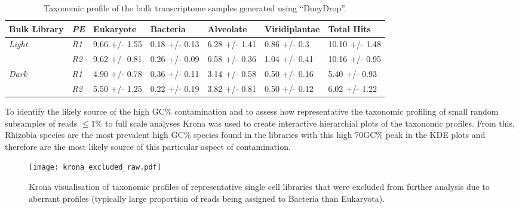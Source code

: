 \begin{table}[h]
     \begin{tabular}{|l|l|l|l|l|l||l|}
\hline
         \textbf{Bulk Library} & \textit{\textbf{PE}} & \textbf{Eukaryote} & \textbf{Bacteria} & \textbf{Alveolate} & \textbf{Viridiplantae} &  \textbf{Total Hits} \\ 
         \hline
         \textit{Light}    & \textit{R1}              &  9.66 +/- 1.55     & 0.18 +/- 0.13     &  6.28 +/- 1.41     &  0.86 +/- 0.3          & 10.10 +/- 1.48       \\ \cmidrule(lr){2-2}
                              & \textit{R2}           &  9.62 +/- 0.81     & 0.26 +/- 0.09    &  6.58 +/- 0.36     &  1.04 +/- 0.41         &   10.16 +/- 0.95      \\ 
                              \hline 
         \textit{Dark}   & \textit{R1}                &  4.90 +/- 0.78     & 0.36 +/- 0.11    &  3.14 +/- 0.58     &  0.50 +/- 0.16        &   5.40 +/- 0.93      \\ \cmidrule(lr){2-2}
                              & \textit{R2}           &  5.50 +/- 1.25     & 0.22 +/- 0.19   &  3.82 +/- 0.81     &  0.50 +/- 0.12         &  6.02 +/- 1.22      \\ 
                              \hline
    \end{tabular}
    \caption{Taxonomic profile of the bulk transcriptome samples generated using ``DueyDrop''.}
    \label{tab:bulk_duey}
\end{table}

To identify the likely source of the high GC\% contamination 
and to assess how representative the taxonomic profiling of small random
subsamples of reads \(\leq1\%\) to full scale analyses Krona was used to 
create interactive hierarchial plots of the taxonomic profiles. 
From this, Rhizobia species are the most prevalent high GC\% species found in the libraries
with this high 70GC\% peak in the KDE plots and therefore are the most likely source
of this particular aspect of contamination. 

\begin{figure}[h]
    \texttt{[image: krona\_excluded\_raw.pdf]}
    \caption{Krona visualisation of taxonomic profiles of representative
    single cell libraries that were excluded from further analysis due 
    to aberrant profiles (typically large proportion of reads being assigned
to Bacteria than Eukaryota).}
    \label{fig:krona_excluded}
\end{figure}

